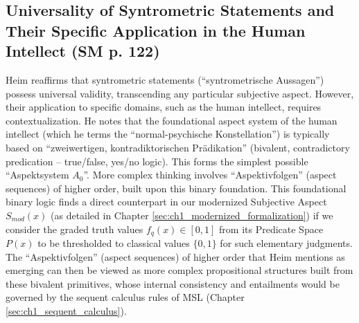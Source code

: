 \documentclass[
    12pt,              %
    a4paper,           %
    headings=normal,   %
    twoside=true,      %
    BCOR=8mm,          %
]{scrbook}
\newcommand{\q}[1]{\enquote{#1}}
\begin{document}
\subsection{Universality of Syntrometric Statements and Their Specific Application in the Human Intellect (SM p. 122)}
\label{sec:ch7_1_1_universality_human}
Heim reaffirms that syntrometric statements (\q{syntrometrische Aussagen}) possess universal validity, transcending any particular subjective aspect. However, their application to specific domains, such as the human intellect, requires contextualization. He notes that the foundational aspect system of the human intellect (which he terms the \q{normal-psychische Konstellation}) is typically based on \q{zweiwertigen, kontradiktorischen Prädikation} (bivalent, contradictory predication – true/false, yes/no logic). This forms the simplest possible \q{Aspektsystem \(A_0\)}. More complex thinking involves \q{Aspektivfolgen} (aspect sequences) of higher order, built upon this binary foundation.
This foundational binary logic finds a direct counterpart in our modernized Subjective Aspect \(S_{mod}(x)\) (as detailed in Chapter \ref{sec:ch1_modernized_formalization}) if we consider the graded truth values \(f_q(x) \in [0,1]\) from its Predicate Space \(P(x)\) to be thresholded to classical values \(\{0,1\}\) for such elementary judgments. The \q{Aspektivfolgen} (aspect sequences) of higher order that Heim mentions as emerging can then be viewed as more complex propositional structures built from these bivalent primitives, whose internal consistency and entailments would be governed by the sequent calculus rules of MSL (Chapter \ref{sec:ch1_sequent_calculus}).
\end{document}
